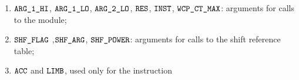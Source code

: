\begin{enumerate}
    \item $\texttt{ARG}\texttt{\_1}\texttt{\_HI}$, $\texttt{ARG}\texttt{\_1}\texttt{\_LO}$, $\texttt{ARG}\texttt{\_2}\texttt{\_LO}$, $\texttt{RES}$, $\texttt{INST}$, $\texttt{WCP\_CT\_MAX}$:
	arguments for calls to the \wcpMod{} module;
    \item $\texttt{SHF\_FLAG}$ ,$\texttt{SHF\_ARG}$, $\texttt{SHF\_POWER}$:
	arguments for calls to the shift reference table;
    \item $\texttt{ACC}$ and $\texttt{LIMB}$,  used only for the  instruction
\end{enumerate}
